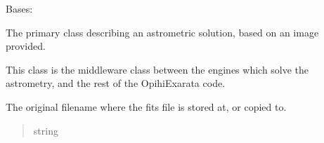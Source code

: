 \documentclass[letterpaper,11pt,english]{sphinxmanual}
\begin{document}
\begin{savenotes}\begin{fulllineitems}
\label{\detokenize{code/opihiexarata.astrometry.solution:opihiexarata.astrometry.solution.AstrometricSolution}}
\pysigstartsignatures
{}
\pysigstopsignatures
\sphinxAtStartPar
Bases: {\hyperref[\detokenize{code/opihiexarata.library.engine:opihiexarata.library.engine.ExarataSolution}]{}}

\sphinxAtStartPar
The primary class describing an astrometric solution, based on an image
provided.

\sphinxAtStartPar
This class is the middleware class between the engines which solve the
astrometry, and the rest of the OpihiExarata code.

\begin{savenotes}\begin{fulllineitems}
\label{\detokenize{code/opihiexarata.astrometry.solution:opihiexarata.astrometry.solution.AstrometricSolution._original_filename}}
\pysigstartsignatures
{}
\pysigstopsignatures
\sphinxAtStartPar
The original filename where the fits file is stored at, or copied to.
\begin{quote}\begin{description}
\sphinxAtStartPar
string

\end{description}\end{quote}

\end{fulllineitems}\end{savenotes}


\end{fulllineitems}
\end{savenotes}
\end{document}
